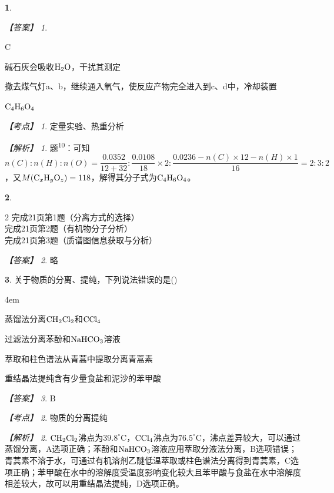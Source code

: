\documentclass[UTF8, 10pt, a4paper, oneside]{ctexart}
\newcommand{\fs}[1]{{\fangsong #1}}%
\theoremstyle{definition}
\newtheorem{subexercise}{}[exercise]%
\theoremstyle{remark}
\newtheorem*{answer}{【答案】}
\newtheorem*{point}{【考点】}      %
\newtheorem*{explanation}{【解析】}     %
\theoremstyle{plain}
\begin{document}
\begin{subexercise}
\begin{answer}
\begin{inparaenum}
            \item C
            \item 碱石灰会吸收$\ce{H2O}$，干扰其测定
            \item 撤去煤气灯a、b，继续通入氧气，使反应产物完全进入到c、d中，冷却装置
            \item $\ce{C4H6O4}$
        \end{inparaenum}
    \end{answer}
    \begin{point}
        定量实验、热重分析
    \end{point}
    \begin{explanation}
        题\textsuperscript{10}：可知$n(C):n(H):n(O)=\dfrac{0.0352}{12+32}:\dfrac{0.0108}{18}\times 2 :\dfrac{0.0236-n(C)\times 12-n(H)\times 1}{16}=2:3:2$，又$M(\ce{C_xH_yO_z})=118$，解得其分子式为$\ce{C4H6O4}$。
    \end{explanation}
\end{subexercise}
\setcounter{subexercise}{0}
\addtocounter{exercise}{1}
\begin{subexercise}
    \begin{multicols}{2}
        \noindent 完成21页第1题（分离方式的选择）\\
        完成21页第2题（有机物分子分析）\\
        完成21页第3题（质谱图信息获取与分析）
    \end{multicols}
    \begin{answer}
        \fs{略}
    \end{answer}
    \newpage
\end{subexercise}
\begin{subexercise}
    \fs{[2024·湖北卷]}关于物质的分离、提纯，下列说法错误的是\quad(\quad)
    \begin{adjustwidth}{4em}{}
        \begin{asparaenum}[A. ]
            \item 蒸馏法分离$\ce{CH2Cl2}$和$\ce{CCl4}$
            \item 过滤法分离苯酚和$\ce{NaHCO3}$溶液
            \item 萃取和柱色谱法从青蒿中提取分离青蒿素
            \item 重结晶法提纯含有少量食盐和泥沙的苯甲酸
        \end{asparaenum}
    \end{adjustwidth}
    \begin{answer}
        B
    \end{answer}
    \begin{point}
        物质的分离提纯
    \end{point}
    \begin{explanation}
        $\ce{CH2Cl2}$沸点为$39.8^\circ$C，$\ce{CCl4}$沸点为$76.5^\circ$C，沸点差异较大，可以通过蒸馏分离，A选项正确；苯酚和$\ce{NaHCO3}$溶液应用萃取分液法分离，B选项错误；青蒿素不溶于水，可通过有机溶剂乙醚低温萃取或柱色谱法分离得到青蒿素，C选项正确；苯甲酸在水中的溶解度受温度影响变化较大且苯甲酸与食盐在水中溶解度相差较大，故可以用重结晶法提纯，D选项正确。
    \end{explanation}
\end{subexercise}
\end{document}
